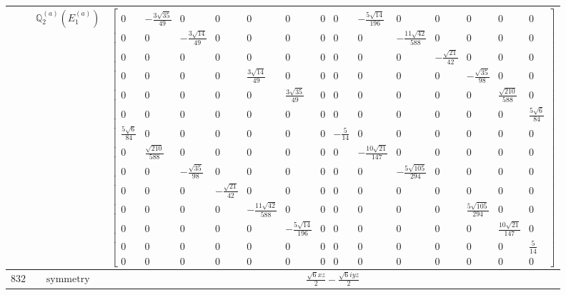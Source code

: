 \documentclass[fleqn,8pt,landscape]{jsarticle}
\begin{document}
\begin{longtable}{ccc}
$  $ & $ \mathbb{Q}_{2}^{(a)}(E_{1}^{(a)}) $ & $ \begin{bmatrix} 0 & - \frac{3 \sqrt{35}}{49} & 0 & 0 & 0 & 0 & 0 & 0 & - \frac{5 \sqrt{14}}{196} & 0 & 0 & 0 & 0 & 0 \\ 0 & 0 & - \frac{3 \sqrt{14}}{49} & 0 & 0 & 0 & 0 & 0 & 0 & - \frac{11 \sqrt{42}}{588} & 0 & 0 & 0 & 0 \\ 0 & 0 & 0 & 0 & 0 & 0 & 0 & 0 & 0 & 0 & - \frac{\sqrt{21}}{42} & 0 & 0 & 0 \\ 0 & 0 & 0 & 0 & \frac{3 \sqrt{14}}{49} & 0 & 0 & 0 & 0 & 0 & 0 & - \frac{\sqrt{35}}{98} & 0 & 0 \\ 0 & 0 & 0 & 0 & 0 & \frac{3 \sqrt{35}}{49} & 0 & 0 & 0 & 0 & 0 & 0 & \frac{\sqrt{210}}{588} & 0 \\ 0 & 0 & 0 & 0 & 0 & 0 & 0 & 0 & 0 & 0 & 0 & 0 & 0 & \frac{5 \sqrt{6}}{84} \\ \frac{5 \sqrt{6}}{84} & 0 & 0 & 0 & 0 & 0 & 0 & - \frac{5}{14} & 0 & 0 & 0 & 0 & 0 & 0 \\ 0 & \frac{\sqrt{210}}{588} & 0 & 0 & 0 & 0 & 0 & 0 & - \frac{10 \sqrt{21}}{147} & 0 & 0 & 0 & 0 & 0 \\ 0 & 0 & - \frac{\sqrt{35}}{98} & 0 & 0 & 0 & 0 & 0 & 0 & - \frac{5 \sqrt{105}}{294} & 0 & 0 & 0 & 0 \\ 0 & 0 & 0 & - \frac{\sqrt{21}}{42} & 0 & 0 & 0 & 0 & 0 & 0 & 0 & 0 & 0 & 0 \\ 0 & 0 & 0 & 0 & - \frac{11 \sqrt{42}}{588} & 0 & 0 & 0 & 0 & 0 & 0 & \frac{5 \sqrt{105}}{294} & 0 & 0 \\ 0 & 0 & 0 & 0 & 0 & - \frac{5 \sqrt{14}}{196} & 0 & 0 & 0 & 0 & 0 & 0 & \frac{10 \sqrt{21}}{147} & 0 \\ 0 & 0 & 0 & 0 & 0 & 0 & 0 & 0 & 0 & 0 & 0 & 0 & 0 & \frac{5}{14} \\ 0 & 0 & 0 & 0 & 0 & 0 & 0 & 0 & 0 & 0 & 0 & 0 & 0 & 0 \end{bmatrix} $ \\ \hline
$ 832 $ & $ \text{symmetry} $ & $ \frac{\sqrt{6} x z}{2} - \frac{\sqrt{6} i y z}{2} $ \\

\end{longtable}
\end{document}
